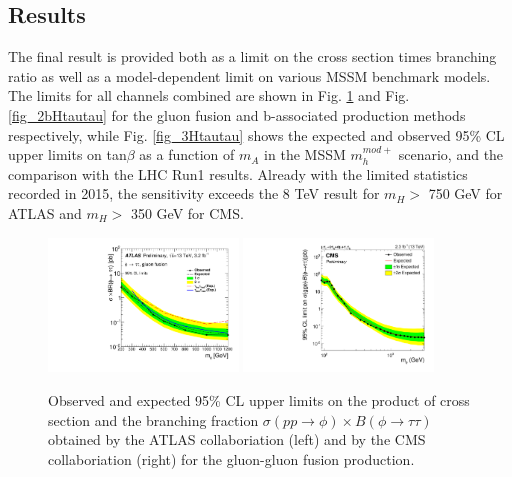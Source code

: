 \subsection{Results}
The final result is provided both as a limit on the cross section times branching ratio as well
as a model-dependent limit on various MSSM benchmark models. The limits for all channels combined are shown in Fig. \ref{fig_2aHtautau} and Fig. \ref{fig_2bHtautau}
for the gluon fusion and b-associated production methods respectively, while Fig. \ref{fig_3Htautau} shows the expected and observed 95\% CL upper limits on tan$\beta$ as a function of $m_{A}$ in the MSSM $m_{h}^{mod+}$ scenario, and the comparison with the LHC Run1 results. Already with the  limited statistics recorded in 2015, the sensitivity exceeds the 8 TeV result for $m_{H} >$ 750 GeV for ATLAS and  $m_{H} >$ 350 GeV for CMS. 

\begin{figure}
\centering
\includegraphics[width=0.45\textwidth, angle=0] {figures/fig_2Htautau_a.pdf}
\includegraphics[width=0.45\textwidth, angle=0] {figures/fig_2Htautau_c.pdf}
\caption{ Observed and expected 95\% CL upper limits on the product of cross section and the branching fraction $\sigma(pp\rightarrow \phi) \times B(\phi\rightarrow \tau\tau)$ obtained by the ATLAS collaboriation (left) and by the CMS collaboriation (right) for the gluon-gluon fusion production.}
\label{fig_2aHtautau}   
\end{figure}


